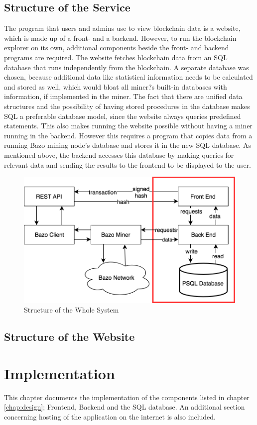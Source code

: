 \section{Structure of the Service}
The program that users and admins use to view blockchain data is a website, which is made up of a front- and a backend. However, to run the blockchain explorer on its own, additional components beside the front- and backend programs are required. The website fetches blockchain data from an SQL database that runs independently from the blockchain. A separate database was chosen, because additional data like statistical information needs to be calculated and stored as well, which would bloat all miner?s built-in databases with information, if implemented in the miner. The fact that there are unified data structures and the possibility of having stored procedures in the database makes SQL a preferable database model, since the website always queries predefined statements. This also makes running the website possible without having a miner running in the backend. However this requires a program that copies data from a running Bazo mining node's database and stores it in the new  SQL database. As mentioned above, the backend accesses this database by making queries for relevant data and sending the results to the frontend to be displayed to the user.
\begin{figure}
  \includegraphics[width=\linewidth]{system.png}
  \caption{Structure of the Whole System}
  \label{fig:structure}
\end{figure}
\section{Structure of the Website}

\chapter{Implementation}
This chapter documents the implementation of the components listed in chapter \ref{chap:design}; Frontend, Backend and the SQL database. An additional section concerning hosting of the application on the internet is also included.
